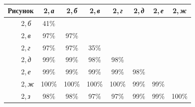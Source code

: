 \begin{multicols}{2}
\setcounter{figure}{1}
\begin{figure*}[b] %
\begin{center}
\mbox{%
\epsfxsize=164.261mm
}
\end{center}
\vspace*{-9pt}
\renewcommand{\figurename}{\protect\bf Таблица}
\setcounter{figure}{0}
{\small
\begin{center}
\vspace*{2ex}

\tabcolsep=10pt
\begin{tabular}{|l|c|c|c|c|c|c|c|}
\hline
\multicolumn{1}{|c|}{Рисунок}&2,\,\textit{а}&2,\,\textit{б}&2,\,\textit{в}&2,\,\textit{г}&2,\,\textit{д}&2,\,\textit{е}&
2,\,\textit{ж}\\
\hline
\ \ \ \ 2,\,\textit{б}&41\%&&&&&&\\
\ \ \ \ 2,\,\textit{в}&97\%&97\%&&&&&\\
\ \ \ \ 2,\,\textit{г}&97\%&97\%&35\%&&&&\\
\ \ \ \ 2,\,\textit{д}&99\%&99\%&98\%&98\%&&&\\
\ \ \ \ 2,\,\textit{е}&99\%&99\%&99\%&99\%&98\%&&\\
\ \ \ \ 2,\,\textit{ж}&100\%\hphantom{9}&100\%\hphantom{9}&100\%\hphantom{9}&
100\%\hphantom{9}&99\%&99\%&\\
\ \ \ \ 2,\,\textit{з}&98\%&98\%&97\%&97\%&99\%&99\%&100\%\\
\hline
\end{tabular}
\end{center}}
\end{figure*}



\pagebreak

\begin{center}  %
\vspace*{2pt}
\mbox{%
\epsfxsize=78mm
}
  \vspace*{2pt}


\end{center}
\end{multicols}
